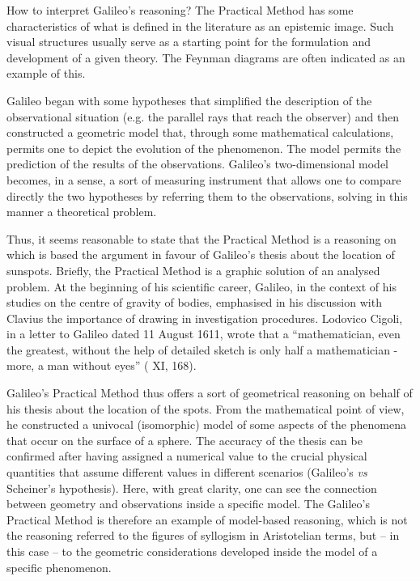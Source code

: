 \begin{artengenv}
How to interpret Galileo’s reasoning? The Practical Method has some characteristics of what is defined in the literature
as an epistemic image. Such visual structures usually serve as a starting point for the formulation and development of
a given theory. The Feynman diagrams are often indicated as an example of this.

Galileo began with some hypotheses that simplified the description of the observational situation (e.g. the parallel
rays that reach the observer) and then constructed a geometric model that, through some mathematical calculations,
permits one to depict the evolution of the phenomenon. The model permits the prediction of the results of the
observations. Galileo’s two-dimensional model becomes, in a sense, a sort of measuring instrument that allows one to
compare directly the two hypotheses by referring them to the observations, solving in this manner a theoretical
problem. 

Thus, it seems reasonable to state that the Practical Method is a reasoning on which is based the argument in favour of
Galileo’s thesis about the location of sunspots. Briefly, the Practical Method is a graphic solution of an analysed
problem. At the beginning of his scientific career, Galileo, in the context of his studies on the centre of gravity of
bodies, emphasised in his discussion with Clavius the importance of drawing in investigation procedures. Lodovico
Cigoli, in a letter to Galileo dated 11 August 1611, wrote that a ``mathematician, even the greatest, without the help
of detailed sketch is only half a mathematician - more, a man without eyes'' ( XI, 168).

Galileo’s Practical Method thus offers a sort of geometrical reasoning on behalf of his thesis about the location of the
spots. From the mathematical point of view, he constructed a univocal (isomorphic) model of some aspects of the
phenomena that occur on the surface of a sphere. The accuracy of the thesis can be confirmed after having assigned a
numerical value to the crucial physical quantities that assume different values in different scenarios (Galileo’s
\textit{vs} Scheiner’s hypothesis). Here, with great clarity, one can see the connection between geometry and
observations inside a specific model. The Galileo’s Practical Method is therefore an example of model-based reasoning,
which is not the reasoning referred to the figures of syllogism in Aristotelian terms, but -- in this case -- to the
geometric considerations developed inside the model of a specific phenomenon. 


\end{artengenv}
